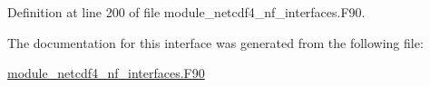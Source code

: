 Definition at line 200 of file module\+\_\+netcdf4\+\_\+nf\+\_\+interfaces.\+F90.



The documentation for this interface was generated from the following file\+:\begin{DoxyCompactItemize}
\item 
\hyperlink{module__netcdf4__nf__interfaces_8F90}{module\+\_\+netcdf4\+\_\+nf\+\_\+interfaces.\+F90}\end{DoxyCompactItemize}

